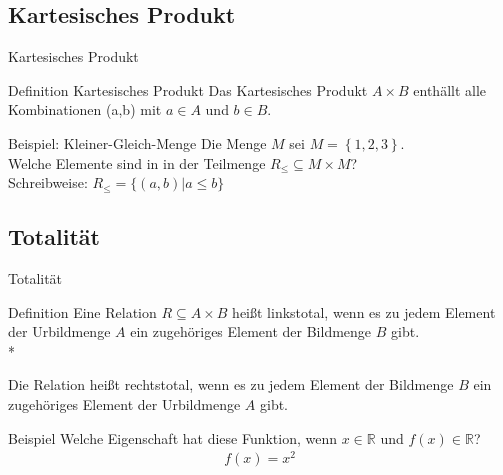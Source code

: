     \subsection{Kartesisches Produkt}
    \begin{frame}{Kartesisches Produkt}
        \begin{block}{Definition Kartesisches Produkt}
            Das Kartesisches Produkt $A \times B$ enthällt alle Kombinationen (a,b) mit $a \in A$ und $b \in B$.
        \end{block}
        \pause
        \begin{exampleblock}{Beispiel: Kleiner-Gleich-Menge}
            Die Menge $M$ sei $M = \left\{ 1, 2, 3\right\}$.\\
            Welche Elemente sind in in der Teilmenge $R_{\leq} \subseteq M \times M$?\\
            Schreibweise: $R_\leq = \{ (a,b) | a \leq b\}$\\
            \pause
        \end{exampleblock}
    \end{frame}
            

    \subsection{Totalität}
        \begin{frame}{Totalität}
            \begin{block}{Definition}
                Eine Relation $R \subseteq A \times B $ heißt linkstotal, wenn es zu jedem Element der Urbildmenge $A$ ein zugehöriges Element der Bildmenge $B$ gibt.\\*


                Die Relation heißt rechtstotal, wenn es zu jedem Element der Bildmenge $B$ ein zugehöriges Element der Urbildmenge $A$ gibt.
            \end{block}
            \pause
            \begin{exampleblock}{Beispiel}
                Welche Eigenschaft hat diese Funktion, wenn $x \in \mathbb{R}$ und $f(x) \in \mathbb{R}$? 
                \begin{align*}
                    f\left(x\right) = x^2
                \end{align*}
                \pause
            \end{exampleblock}
        \end{frame}

